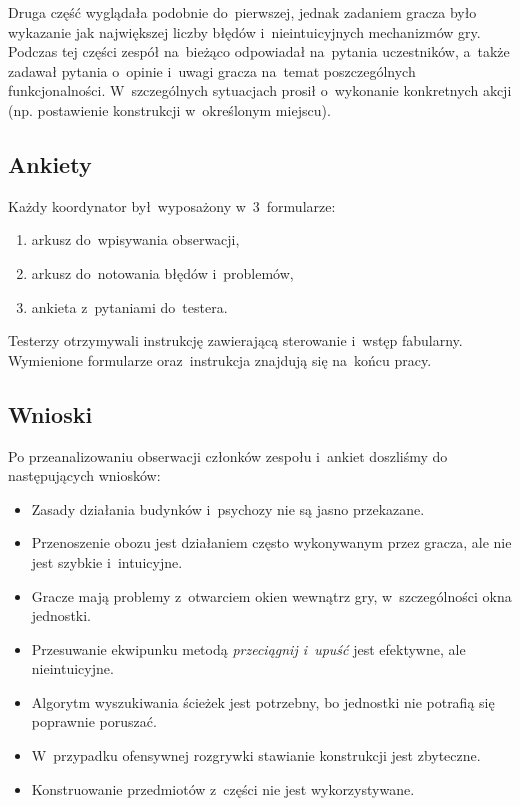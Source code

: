 \documentclass[licencjacka]{pracamgr}
\begin{document}
      Druga część wyglądała podobnie do~pierwszej, jednak zadaniem gracza było wykazanie
      jak największej liczby błędów i~nieintuicyjnych mechanizmów gry.
      Podczas tej części zespół na~bieżąco odpowiadał na~pytania uczestników,
      a~także zadawał pytania o~opinie i~uwagi gracza na~temat poszczególnych funkcjonalności.
      W~szczególnych sytuacjach prosił o~wykonanie konkretnych akcji (np. postawienie konstrukcji w~określonym miejscu).

    \subsection{Ankiety}
      Każdy koordynator był~wyposażony w~3~formularze:
      \begin{enumerate}
	\item arkusz do~wpisywania obserwacji,
	\item arkusz do~notowania błędów i~problemów,
	\item ankieta z~pytaniami do~testera.
      \end{enumerate}
      Testerzy otrzymywali instrukcję zawierającą sterowanie i~wstęp fabularny. Wymienione formularze oraz~instrukcja
      znajdują się na~końcu pracy.

    \subsection{Wnioski}
      Po przeanalizowaniu obserwacji członków zespołu i~ankiet doszliśmy do następujących wniosków:
      \begin{itemize}
	\item Zasady działania budynków i~psychozy nie są jasno przekazane.
	\item Przenoszenie obozu jest działaniem często wykonywanym przez gracza, ale nie jest szybkie i~intuicyjne.
	\item Gracze mają problemy z~otwarciem okien wewnątrz gry, w~szczególności okna jednostki.
	\item Przesuwanie ekwipunku metodą \emph{przeciągnij i~upuść} jest efektywne, ale nieintuicyjne.
	\item Algorytm wyszukiwania ścieżek jest potrzebny, bo jednostki nie potrafią się poprawnie poruszać.
	\item W~przypadku ofensywnej rozgrywki stawianie konstrukcji jest zbyteczne.
	\item Konstruowanie przedmiotów z~części nie jest wykorzystywane.
      \end{itemize}
\end{document}

